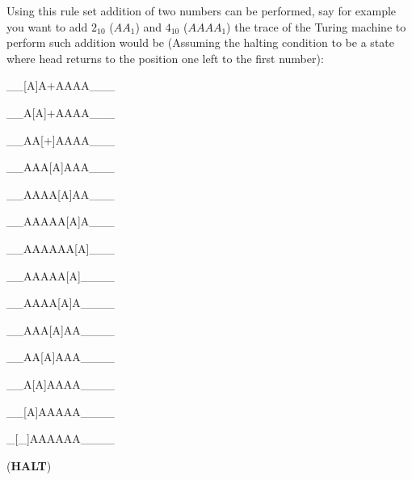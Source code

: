 \documentclass[a4paper,10pt]{article}
\theoremstyle{mytheor}
\begin{document}
{    Using this rule set addition of two numbers can be performed, say
    for example you want to add $2_{10}$ ($AA_1$) and $4_{10}$
    ($AAAA_1$) the trace of the Turing machine to perform such
    addition would be (Assuming the halting condition to be a state
    where head returns to the position one left to the first number):
    \begin{legal}
    \item \begin{textsc}\_\_[A]A+AAAA\_\_\_\end{textsc}
    \item \begin{textsc}\_\_A[A]+AAAA\_\_\_\end{textsc}
    \item \begin{textsc}\_\_AA[+]AAAA\_\_\_\end{textsc}
    \item \begin{textsc}\_\_AAA[A]AAA\_\_\_\end{textsc}
    \item \begin{textsc}\_\_AAAA[A]AA\_\_\_\end{textsc}
    \item \begin{textsc}\_\_AAAAA[A]A\_\_\_\end{textsc}
    \item \begin{textsc}\_\_AAAAAA[A]\_\_\_\end{textsc}
      
    \item \begin{textsc}\_\_AAAAA[A]\_\_\_\_\end{textsc}
    \item \begin{textsc}\_\_AAAA[A]A\_\_\_\_\end{textsc}
    \item \begin{textsc}\_\_AAA[A]AA\_\_\_\_\end{textsc}
    \item \begin{textsc}\_\_AA[A]AAA\_\_\_\_\end{textsc}
    \item \begin{textsc}\_\_A[A]AAAA\_\_\_\_\end{textsc}
    \item \begin{textsc}\_\_[A]AAAAA\_\_\_\_\end{textsc}
    \item \begin{textsc}\_[\_]AAAAAA\_\_\_\_\end{textsc} (\textbf{HALT})
    \end{legal}

}
\end{document}
